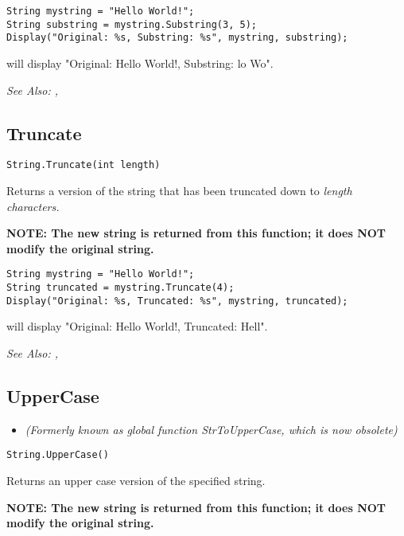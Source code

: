 \begin{verbatim}
String mystring = "Hello World!";
String substring = mystring.Substring(3, 5);
Display("Original: %s, Substring: %s", mystring, substring);
\end{verbatim}
will display "Original: Hello World!, Substring: lo Wo".

\it{See Also:} , 


\subsection{Truncate}\label{String.Truncate}%

\begin{verbatim}
String.Truncate(int length)
\end{verbatim}
Returns a version of the string that has been truncated down to \it{length}
characters.

\bf{NOTE:} The new string is returned from this function; it
does \bf{NOT} modify the original string.

\begin{verbatim}
String mystring = "Hello World!";
String truncated = mystring.Truncate(4);
Display("Original: %s, Truncated: %s", mystring, truncated);
\end{verbatim}
will display "Original: Hello World!, Truncated: Hell".

\it{See Also:} , 


\subsection{UpperCase}\label{String.UpperCase}%

\begin{itemize}
\item \it{(Formerly known as global function StrToUpperCase, which is now obsolete)}
\end{itemize}

\begin{verbatim}
String.UpperCase()
\end{verbatim}
Returns an upper case version of the specified string.

\bf{NOTE:} The new string is returned from this function; it
does \bf{NOT} modify the original string.

